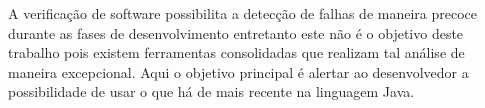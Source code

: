 A verifica\c{c}\~{a}o de software possibilita a detec\c{c}\~{a}o de falhas de maneira precoce durante as fases de desenvolvimento entretanto este n\~{a}o \'{e} o objetivo deste trabalho pois existem ferramentas consolidadas que realizam tal an\'{a}lise de maneira excepcional. Aqui o objetivo principal \'{e} alertar ao desenvolvedor a possibilidade de usar o que h\'{a} de mais recente na linguagem Java.






